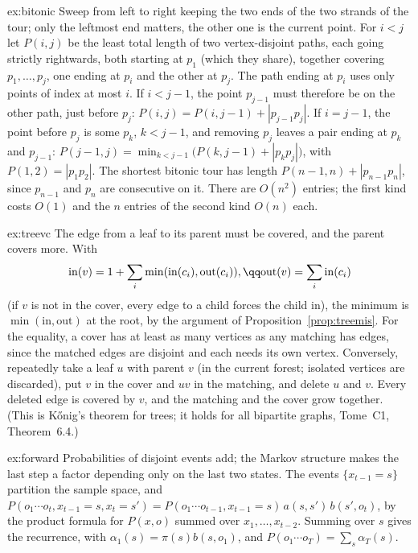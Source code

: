 \begin{solution}{ex:bitonic}
\idea Sweep from left to right keeping the two ends of the two strands of the tour; only the leftmost end matters, the other one is the current point.
\writeup For $i<j$ let $P(i,j)$ be the least total length of two vertex-disjoint paths, each going strictly rightwards, both starting at $p_1$ (which they share), together covering $p_1,\dots,p_j$, one ending at $p_i$ and the other at $p_j$. The
path ending at $p_i$ uses only points of index at most $i$. If $i<j-1$, the point $p_{j-1}$ must therefore be on the other path, just before $p_j$: $P(i,j)=P(i,j-1)+|p_{j-1}p_j|$. If $i=j-1$, the point before $p_j$ is some $p_k$, $k<j-1$, and removing $p_j$ leaves a pair ending at $p_k$ and $p_{j-1}$:
$P(j-1,j)=\min_{k<j-1}\big(P(k,j-1)+|p_kp_j|\big)$, with $P(1,2)=|p_1p_2|$. The shortest bitonic tour has length $P(n-1,n)+|p_{n-1}p_n|$, since $p_{n-1}$ and $p_n$ are consecutive on it. There are $O(n^2)$ entries; the first kind costs $O(1)$ and the $n$ entries of the second kind $O(n)$ each.
\end{solution}

\begin{solution}{ex:treevc}
\idea The edge from a leaf to its parent must be covered, and the parent covers more.
\writeup With
\[
\begin{gathered}\mathrm{in}(v)=1+\sum_i\min(\mathrm{in}(c_i),\mathrm{out}(c_i)),\qq\mathrm{out}(v)=\sum_i\mathrm{in}(c_i)\end{gathered}
\]
 (if $v$ is not in the cover, every edge to a child forces the child in), the minimum is $\min(\mathrm{in},\mathrm{out})$ at the root, by the argument of Proposition~\ref{prop:treemis}. For the equality, a cover has at least as many vertices
as any matching has edges, since the matched edges are disjoint and each needs its own vertex. Conversely, repeatedly take a leaf $u$ with parent $v$ (in the current forest; isolated vertices are discarded), put $v$ in the cover and $uv$ in the matching, and delete $u$ and $v$. Every deleted edge is covered by $v$, and the
matching and the cover grow together. (This is K\H{o}nig's theorem for trees; it holds for all bipartite graphs, Tome~C1, Theorem~6.4.)
\end{solution}

\begin{solution}{ex:forward}
\idea Probabilities of disjoint events add; the Markov structure makes the last step a factor depending only on the last two states.
\writeup The events $\{x_{t-1}=s\}$ partition the sample space, and $P(o_1\cdots o_t,x_{t-1}=s,x_t=s')=P(o_1\cdots o_{t-1},x_{t-1}=s)\,a(s,s')\,b(s',o_t)$, by the product formula for $P(x,o)$ summed over $x_1,\dots,x_{t-2}$. Summing over $s$ gives the recurrence, with $\alpha_1(s)=\pi(s)b(s,o_1)$,
and $P(o_1\cdots o_T)=\sum_s\alpha_T(s)$.
\end{solution}

